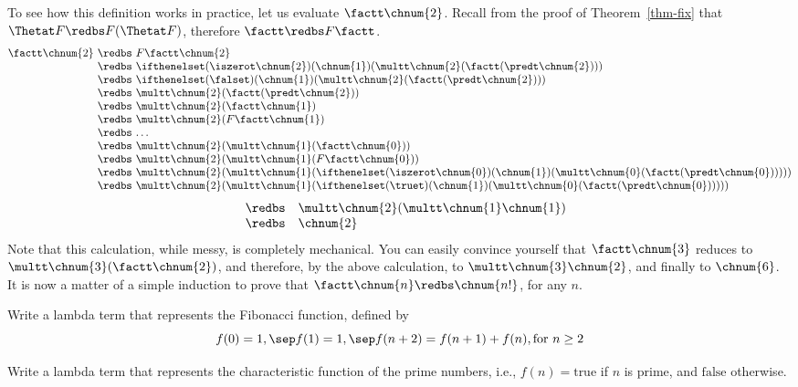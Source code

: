\documentclass[12pt]{article}
\begin{document}
To see how this definition works in practice, let us evaluate $\factt
\chnum{2}$. Recall from the proof of Theorem~\ref{thm-fix} that
$\Thetat F\redbs F(\Thetat F)$, therefore $\factt \redbs F\factt$.
\[ \begin{array}{@{}r@{~}c@{~}l@{}}
  \factt\chnum{2}
  &\redbs& F\factt\chnum{2} \\
  &\redbs& \ifthenelset(\iszerot \chnum{2}) (\chnum{1}) 
  (\multt \chnum{2} (\factt (\predt \chnum{2}))) \\
  &\redbs& \ifthenelset (\falset) (\chnum{1}) 
  (\multt \chnum{2} (\factt (\predt \chnum{2}))) \\
  &\redbs& \multt \chnum{2} (\factt (\predt \chnum{2})) \\
  &\redbs& \multt \chnum{2} (\factt \chnum{1}) \\
  &\redbs& \multt \chnum{2} (F\factt \chnum{1}) \\
  &\redbs& \ldots \\
  &\redbs& \multt \chnum{2} (\multt \chnum{1} (\factt\chnum{0})) \\
  &\redbs& \multt \chnum{2} (\multt \chnum{1} (F\factt\chnum{0})) \\
  &\redbs& \multt \chnum{2} (\multt \chnum{1} (\ifthenelset(\iszerot
  \chnum{0}) (\chnum{1}) (\multt \chnum{0} (\factt (\predt \chnum{0}))))) \\
  &\redbs& \multt \chnum{2} (\multt \chnum{1} (\ifthenelset(\truet)
  (\chnum{1}) (\multt \chnum{0} (\factt (\predt \chnum{0}))))) \\
\end{array}\]\[\begin{array}{rcl}
  &\redbs& \multt \chnum{2} (\multt \chnum{1} \chnum{1}) \\
  &\redbs& \chnum{2}
\end{array}
\]
Note that this calculation, while messy, is completely mechanical. You
can easily convince yourself that $\factt \chnum{3}$ reduces to
$\multt \chnum{3} (\factt \chnum{2})$, and therefore, by the above
calculation, to $\multt \chnum{3} \chnum{2}$, and finally to
$\chnum{6}$. It is now a matter of a simple induction to prove that
$\factt \chnum{n}\redbs \chnum{n!}$, for any $n$.

\begin{exercise}
  Write a lambda term that represents the Fibonacci
  function, defined by
  \[ f(0) = 1,\sep f(1) = 1,\sep f(n+2)=f(n+1)+f(n), \mbox{for $n\geq 2$}
  \]
\end{exercise}

\begin{exercise}
  Write a lambda term that represents the characteristic
  function of the prime numbers, i.e., $f(n)=\mbox{true}$ if $n$ is
  prime, and $\mbox{false}$ otherwise. 
\end{exercise}
\end{document}
